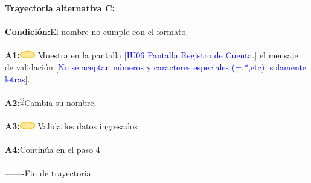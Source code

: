     
                     \textbf{Trayectoria alternativa C:}\\\\
                        \textbf{Condición:}El nombre no cumple con el formato.\\\\
                        \textbf{A1:}\includegraphics[width=0.0500\textwidth]{Figuras/sistema.png} Muestra en la pantalla [\textcolor{blue}{IU06 Pantalla Registro de Cuenta}.] el mensaje de validación [\textcolor{blue}{No se aceptan números y caracteres especiales (=,*,etc), solamente letras}].  \\\\
                        \textbf{A2:}\includegraphics[width=0.0150\textwidth]{Figuras/persona.png}Cambia su nombre.\\\\
                        \textbf{A3:}\includegraphics[width=0.0500\textwidth]{Figuras/sistema.png} Valida los datos ingresados\\\\
                        \textbf{A4:}Continúa en el paso 4 \\\\
                       
        -------Fin de  trayectoria. \\\\

